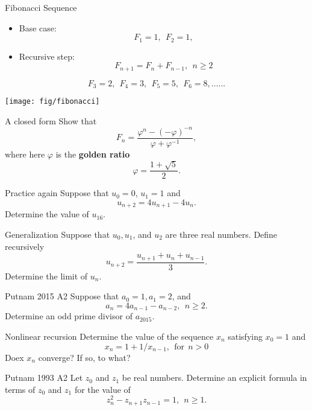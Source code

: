 \documentclass{beamer}
\begin{document}
\begin{frame}{Fibonacci Sequence}
\begin{itemize}
\item Base case:
$$F_1 = 1,\ \ F_2 = 1,$$
\item Recursive step:
$$F_{n+1} = F_n + F_{n-1},\ \ n\geq 2$$
\end{itemize}
$$F_3 = 2,\ \ F_4 = 3,\ \ F_5 = 5,\ \ F_6 = 8,\dots...$$ 
\begin{center}
\texttt{[image: fig/fibonacci]}
\end{center}
\end{frame}

\begin{frame}{A closed form}
Show that
$$F_n = \frac{\varphi^n-(-\varphi)^{-n}}{\varphi+\varphi^{-1}},$$
where here $\varphi$ is the \textbf{golden ratio}
$$\varphi = \frac{1+\sqrt{5}}{2}.$$
\end{frame}

\begin{frame}{Practice again}
Suppose that $u_0 = 0$, $u_1 = 1$ and 
$$u_{n+2} = 4u_{n+1}-4u_n.$$
Determine the value of $u_{16}$.
\end{frame}

\begin{frame}{Generalization}
Suppose that $u_0, u_1$, and $u_2$ are three real numbers.
Define recursively
$$u_{n+2} = \frac{u_{n+1}+u_n+u_{n-1}}{3}.$$
Determine the limit of $u_{n}$.
\end{frame}

\begin{frame}{Putnam 2015 A2}
Suppose that $a_0 = 1, a_1 = 2$, and
$$a_{n} = 4a_{n-1}-a_{n-2},\ \ n\geq 2.$$
Determine an odd prime divisor of $a_{2015}$.
\end{frame}

\begin{frame}{Nonlinear recursion}
Determine the value of the sequence $x_n$ satisfying $x_0 = 1$ and 
$$x_n = 1 + 1/x_{n-1},\ \ \text{for}\ \ n > 0$$
Doex $x_n$ converge?  If so, to what?
\end{frame}

\begin{frame}{Putnam 1993 A2}
Let $z_0$ and $z_1$ be real numbers.
Determine an explicit formula in terms of $z_0$ and $z_1$ for the value of
$$z_{n}^2-z_{n+1}z_{n-1} = 1,\ \ n \geq 1.$$
\end{frame}
\end{document}

